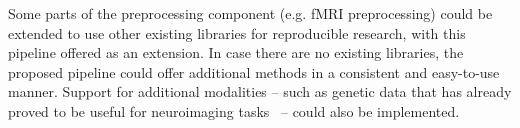 Some parts of the preprocessing component (e.g. fMRI preprocessing) could be extended to use other existing libraries for reproducible research, with this pipeline offered as an extension. In case there are no existing libraries, the proposed pipeline could offer additional methods in a consistent and easy-to-use manner. Support for additional modalities – such as genetic data that has already proved to be useful for neuroimaging tasks~\cite{cole2018brain,parisot2018disease} – could also be implemented.








